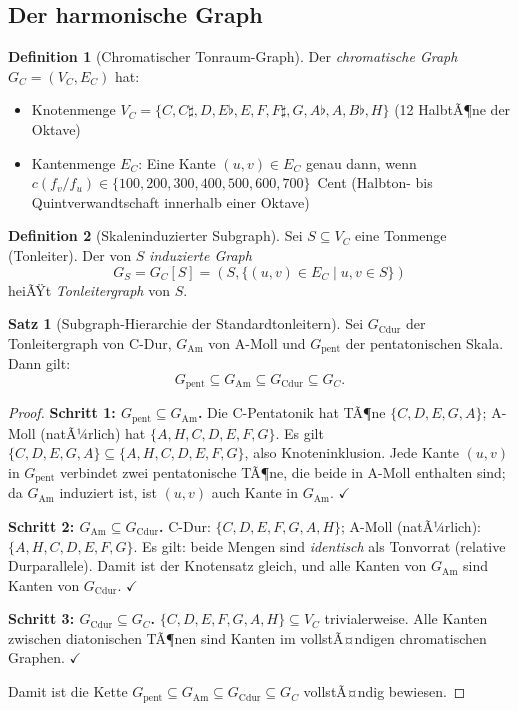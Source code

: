 ﻿\documentclass[a4paper,12pt]{article}
\theoremstyle{definition}
\newtheorem{definition}{Definition}
\newtheorem{satz}{Satz}
\begin{document}
\subsection{Der harmonische Graph}

\begin{definition}[Chromatischer Tonraum-Graph]
Der \emph{chromatische Graph} $G_C = (V_C, E_C)$ hat:
\begin{itemize}
    \item Knotenmenge $V_C = \{C, C\sharp, D, E\flat, E, F, F\sharp, G,
          A\flat, A, B\flat, H\}$ (12 HalbtÃ¶ne der Oktave)
    \item Kantenmenge $E_C$: Eine Kante $(u,v) \in E_C$ genau dann, wenn
          $c(f_v/f_u) \in \{100, 200, 300, 400, 500, 600, 700\}$~Cent
          (Halbton- bis Quintverwandtschaft innerhalb einer Oktave)
\end{itemize}
\end{definition}

\begin{definition}[Skaleninduzierter Subgraph]
Sei $S \subseteq V_C$ eine Tonmenge (Tonleiter). Der von $S$ \emph{induzierte Graph}
\[
G_S = G_C[S] = (S, \{(u,v) \in E_C \mid u,v \in S\})
\]
heiÃŸt \emph{Tonleitergraph} von $S$.
\end{definition}

\begin{satz}[Subgraph-Hierarchie der Standardtonleitern]
\label{satz:subgraph}
Sei $G_{\mathrm{Cdur}}$ der Tonleitergraph von C-Dur, $G_{\mathrm{Am}}$ von
A-Moll und $G_{\mathrm{pent}}$ der pentatonischen Skala. Dann gilt:
\[
G_{\mathrm{pent}} \subseteq G_{\mathrm{Am}} \subseteq G_{\mathrm{Cdur}} \subseteq G_C.
\]
\end{satz}

\begin{proof}
\textbf{Schritt 1: $G_{\mathrm{pent}} \subseteq G_{\mathrm{Am}}$.}
Die C-Pentatonik hat TÃ¶ne $\{C, D, E, G, A\}$; A-Moll (natÃ¼rlich) hat $\{A, H, C, D, E, F, G\}$.
Es gilt $\{C,D,E,G,A\} \subseteq \{A,H,C,D,E,F,G\}$, also Knoteninklusion.
Jede Kante $(u,v)$ in $G_{\mathrm{pent}}$ verbindet zwei pentatonische TÃ¶ne,
die beide in A-Moll enthalten sind; da $G_{\mathrm{Am}}$ induziert ist,
ist $(u,v)$ auch Kante in $G_{\mathrm{Am}}$. $\checkmark$

\textbf{Schritt 2: $G_{\mathrm{Am}} \subseteq G_{\mathrm{Cdur}}$.}
C-Dur: $\{C,D,E,F,G,A,H\}$; A-Moll (natÃ¼rlich): $\{A,H,C,D,E,F,G\}$.
Es gilt: beide Mengen sind \emph{identisch} als Tonvorrat (relative Durparallele).
Damit ist der Knotensatz gleich, und alle Kanten von $G_{\mathrm{Am}}$ sind
Kanten von $G_{\mathrm{Cdur}}$. $\checkmark$

\textbf{Schritt 3: $G_{\mathrm{Cdur}} \subseteq G_C$.}
$\{C,D,E,F,G,A,H\} \subseteq V_C$ trivialerweise. Alle Kanten zwischen diatonischen
TÃ¶nen sind Kanten im vollstÃ¤ndigen chromatischen Graphen. $\checkmark$

Damit ist die Kette $G_{\mathrm{pent}} \subseteq G_{\mathrm{Am}} \subseteq
G_{\mathrm{Cdur}} \subseteq G_C$ vollstÃ¤ndig bewiesen.
\end{proof}
\end{document}

